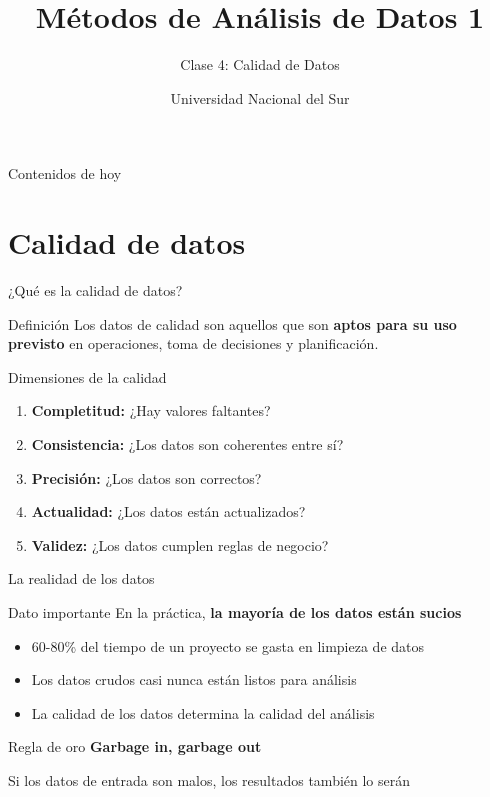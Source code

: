 \documentclass[aspectratio=169]{beamer}
\title{Métodos de Análisis de Datos 1}
\subtitle{Clase 4: Calidad de Datos}
\author{Universidad Nacional del Sur}
\date{}
\begin{document}
\begin{frame}
\titlepage
\end{frame}

\begin{frame}{Contenidos de hoy}
\tableofcontents
\end{frame}

\section{Calidad de datos}

\begin{frame}{¿Qué es la calidad de datos?}
\begin{block}{Definición}
Los datos de calidad son aquellos que son \textbf{aptos para su uso previsto} en operaciones, toma de decisiones y planificación.
\end{block}

\pause

\begin{block}{Dimensiones de la calidad}
\begin{enumerate}
    \item \textbf{Completitud:} ¿Hay valores faltantes?
    \item \textbf{Consistencia:} ¿Los datos son coherentes entre sí?
    \item \textbf{Precisión:} ¿Los datos son correctos?
    \item \textbf{Actualidad:} ¿Los datos están actualizados?
    \item \textbf{Validez:} ¿Los datos cumplen reglas de negocio?
\end{enumerate}
\end{block}
\end{frame}

\begin{frame}{La realidad de los datos}
\begin{alertblock}{Dato importante}
En la práctica, \textbf{la mayoría de los datos están sucios}
\end{alertblock}

\begin{itemize}
    \item 60-80\% del tiempo de un proyecto se gasta en limpieza de datos
    \item Los datos crudos casi nunca están listos para análisis
    \item La calidad de los datos determina la calidad del análisis
\end{itemize}

\pause

\vspace{1em}
\begin{exampleblock}{Regla de oro}
\textbf{Garbage in, garbage out}

Si los datos de entrada son malos, los resultados también lo serán
\end{exampleblock}
\end{frame}
\end{document}
